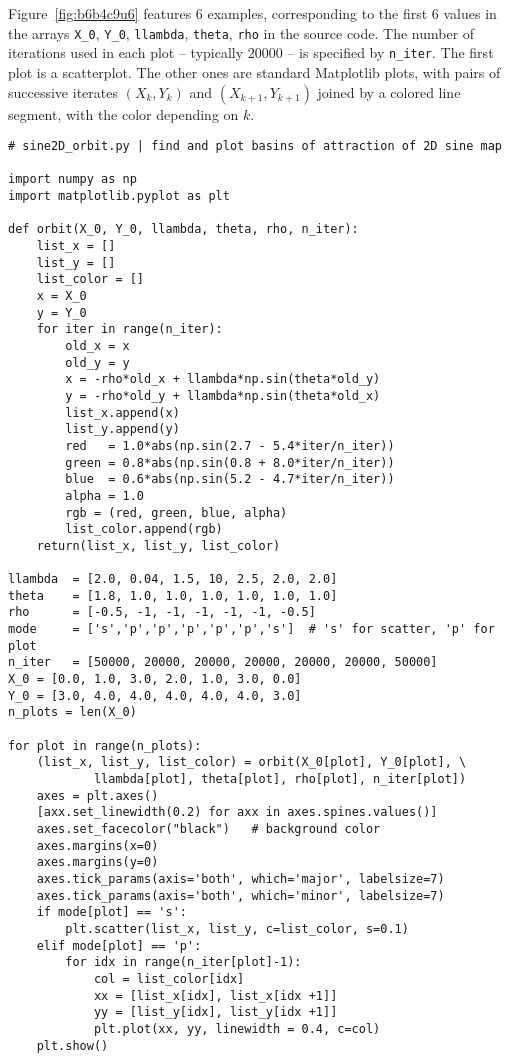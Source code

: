 \documentclass[oneside,10pt]{book}
\begin{document}
Figure~\ref{fig:b6b4c9u6} features 6 examples, corresponding to the first 6 values
 in the arrays \texttt{X\_0}, \texttt{Y\_0}, \texttt{llambda}, \texttt{theta}, \texttt{rho} in the source code. The number of iterations used 
 in each plot -- typically $\num{20000}$ -- is specified 
 by \texttt{n\_iter}. The first plot is a scatterplot. The other ones are standard Matplotlib plots, with 
 pairs of successive iterates $(X_k,Y_k)$ and $(X_{k+1},Y_{k+1})$ joined by a colored line segment, with the color depending on $k$.


\begin{lstlisting}
# sine2D_orbit.py | find and plot basins of attraction of 2D sine map

import numpy as np
import matplotlib.pyplot as plt

def orbit(X_0, Y_0, llambda, theta, rho, n_iter):
    list_x = []
    list_y = []
    list_color = []
    x = X_0
    y = Y_0
    for iter in range(n_iter): 
        old_x = x
        old_y = y
        x = -rho*old_x + llambda*np.sin(theta*old_y)
        y = -rho*old_y + llambda*np.sin(theta*old_x)
        list_x.append(x)
        list_y.append(y)
        red   = 1.0*abs(np.sin(2.7 - 5.4*iter/n_iter)) 
        green = 0.8*abs(np.sin(0.8 + 8.0*iter/n_iter)) 
        blue  = 0.6*abs(np.sin(5.2 - 4.7*iter/n_iter))  
        alpha = 1.0
        rgb = (red, green, blue, alpha)
        list_color.append(rgb)
    return(list_x, list_y, list_color)

llambda  = [2.0, 0.04, 1.5, 10, 2.5, 2.0, 2.0] 
theta    = [1.8, 1.0, 1.0, 1.0, 1.0, 1.0, 1.0]           
rho      = [-0.5, -1, -1, -1, -1, -1, -0.5] 
mode     = ['s','p','p','p','p','p','s']  # 's' for scatter, 'p' for plot
n_iter   = [50000, 20000, 20000, 20000, 20000, 20000, 50000]
X_0 = [0.0, 1.0, 3.0, 2.0, 1.0, 3.0, 0.0]  
Y_0 = [3.0, 4.0, 4.0, 4.0, 4.0, 4.0, 3.0]   
n_plots = len(X_0)    

for plot in range(n_plots):
    (list_x, list_y, list_color) = orbit(X_0[plot], Y_0[plot], \
            llambda[plot], theta[plot], rho[plot], n_iter[plot])
    axes = plt.axes()
    [axx.set_linewidth(0.2) for axx in axes.spines.values()]
    axes.set_facecolor("black")   # background color
    axes.margins(x=0)
    axes.margins(y=0)
    axes.tick_params(axis='both', which='major', labelsize=7)
    axes.tick_params(axis='both', which='minor', labelsize=7)
    if mode[plot] == 's':
        plt.scatter(list_x, list_y, c=list_color, s=0.1)
    elif mode[plot] == 'p':
        for idx in range(n_iter[plot]-1):
            col = list_color[idx]
            xx = [list_x[idx], list_x[idx +1]]
            yy = [list_y[idx], list_y[idx +1]]
            plt.plot(xx, yy, linewidth = 0.4, c=col) 
    plt.show()
\end{lstlisting}
\end{document}

